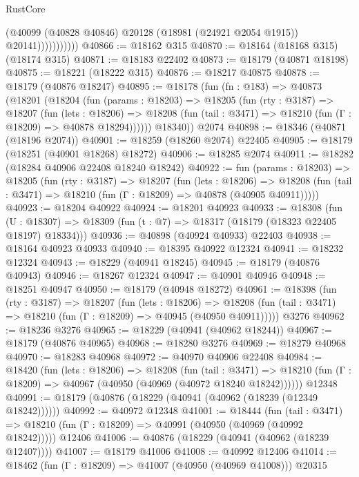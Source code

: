 \begin{lexlean}{RustCore}
\begin{coremodule}
                        (@40099
                          (@40828 @40846)
                          @20128
                          (@18981 (@24921 @2054 @1915))
                          @20141)))))))))))
@40866 := @18162 @315
@40870 := @18164 (@18168 @315) (@18174 @315)
@40871 := @18183 @22402
@40873 := @18179 (@40871 @18198)
@40875 := @18221 (@18222 @315)
@40876 := @18217 @40875
@40878 := @18179 (@40876 @18247)
@40895 := @18178
    (fun (fn : @183) =>
    @40873
      (@18201
        (@18204
          (fun (params : @18203) =>
          @18205
            (fun (rty : @3187) =>
            @18207
              (fun (lets : @18206) =>
              @18208 (fun (tail : @3471) => @18210 (fun (Γ : @18209) => @40878 @18294))))))
        @18340))
    @2074
@40898 := @18346 (@40871 (@18196 @2074))
@40901 := @18259 (@18260 @2074) @22405
@40905 := @18179 (@18251 (@40901 @18268) @18272)
@40906 := @18285 @2074
@40911 := @18282 (@18284 @40906 @22408 @18240 @18242)
@40922 := fun (params : @18203) =>
  @18205
    (fun (rty : @3187) =>
    @18207
      (fun (lets : @18206) =>
      @18208 (fun (tail : @3471) => @18210 (fun (Γ : @18209) => @40878 (@40905 @40911)))))
@40923 := @18204 @40922
@40924 := @18201 @40923
@40933 := @18308
    (fun (U : @18307) => @18309 (fun (t : @7) => @18317 (@18179 (@18323 @22405 @18197) @18334)))
@40936 := @40898 (@40924 @40933) @22403
@40938 := @18164 @40923 @40933
@40940 := @18395 @40922 @12324
@40941 := @18232 @12324
@40943 := @18229 (@40941 @18245)
@40945 := @18179 (@40876 @40943)
@40946 := @18267 @12324
@40947 := @40901 @40946
@40948 := @18251 @40947
@40950 := @18179 (@40948 @18272)
@40961 := @18398
    (fun (rty : @3187) =>
    @18207
      (fun (lets : @18206) =>
      @18208 (fun (tail : @3471) => @18210 (fun (Γ : @18209) => @40945 (@40950 @40911)))))
    @3276
@40962 := @18236 @3276
@40965 := @18229 (@40941 (@40962 @18244))
@40967 := @18179 (@40876 @40965)
@40968 := @18280 @3276
@40969 := @18279 @40968
@40970 := @18283 @40968
@40972 := @40970 @40906 @22408
@40984 := @18420
    (fun (lets : @18206) =>
    @18208
      (fun (tail : @3471) =>
      @18210 (fun (Γ : @18209) => @40967 (@40950 (@40969 (@40972 @18240 @18242))))))
    @12348
@40991 := @18179 (@40876 (@18229 (@40941 (@40962 (@18239 (@12349 @18242))))))
@40992 := @40972 @12348
@41001 := @18444
    (fun (tail : @3471) => @18210 (fun (Γ : @18209) => @40991 (@40950 (@40969 (@40992 @18242)))))
    @12406
@41006 := @40876 (@18229 (@40941 (@40962 (@18239 @12407))))
@41007 := @18179 @41006
@41008 := @40992 @12406
@41014 := @18462 (fun (Γ : @18209) => @41007 (@40950 (@40969 @41008))) @20315

\end{coremodule}
\end{lexlean}
